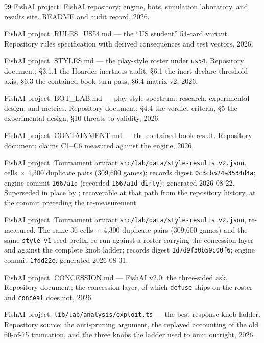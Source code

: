 \documentclass[11pt]{article}
\newcommand{\code}[1]{\texttt{#1}}
\newcommand{\usff}{\code{us54}}
\begin{document}
\begin{thebibliography}{99}
FishAI project.
\newblock FishAI repository: engine, bots, simulation laboratory, and results site.
\newblock README and audit record, 2026.

FishAI project.
\newblock RULES\_US54.md --- the ``US student'' 54-card variant.
\newblock Repository rules specification with derived consequences and test vectors, 2026.

FishAI project.
\newblock STYLES.md --- the play-style roster under \usff{}.
\newblock Repository document; \S3.1.1 the Hoarder inertness audit, \S6.1 the inert
declare-threshold axis, \S6.3 the contained-book turn-pass, \S6.4 matrix v2, 2026.

FishAI project.
\newblock BOT\_LAB.md --- play-style spectrum: research, experimental design, and metrics.
\newblock Repository document; \S4.4 the verdict criteria, \S5 the experimental design,
\S10 threats to validity, 2026.

FishAI project.
\newblock CONTAINMENT.md --- the contained-book result.
\newblock Repository document; claims C1--C6 measured against the engine, 2026.

FishAI project.
\newblock Tournament artifact \code{src/lab/data/style-results.v2.json}.
 cells $\times$ 4{,}300 duplicate pairs (309{,}600 games); records digest
\code{0c3cb524a3534d4a}; engine commit \code{1667a1d} (recorded \code{1667a1d-dirty});
generated 2026-08-22. Superseded in place by \cite{artifactv2b}; recoverable at that path from
the repository history, at the commit preceding the re-measurement.

FishAI project.
\newblock Tournament artifact \code{src/lab/data/style-results.v2.json}, re-measured.
\newblock The same 36 cells $\times$ 4{,}300 duplicate pairs (309{,}600 games) and the same
\code{style-v1} seed prefix, re-run against a roster carrying the concession layer and against
the complete knob ladder; records digest \code{1d7d9f30b59c00f6}; engine commit
\code{1fdd22e}; generated 2026-08-31.

FishAI project.
\newblock CONCESSION.md --- FishAI v2.0: the three-sided ask.
\newblock Repository document; the concession layer, of which \code{defuse} ships on the roster
and \code{conceal} does not, 2026.

FishAI project.
\newblock \code{lib/lab/analysis/exploit.ts} --- the best-response knob ladder.
\newblock Repository source; the anti-pruning argument, the replayed accounting of the old
60-of-75 truncation, and the three knobs the ladder used to omit outright, 2026.

\end{thebibliography}
\end{document}
